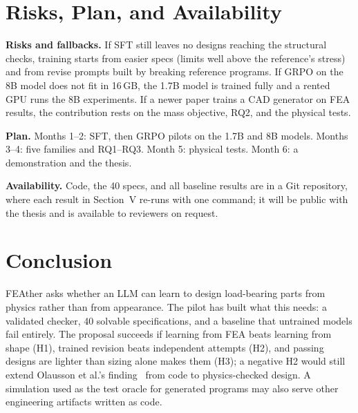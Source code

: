 \documentclass[conference]{IEEEtran}
\begin{document}
\section{Risks, Plan, and Availability}

\textbf{Risks and fallbacks.} If SFT still leaves no designs reaching the structural checks, training
starts from easier specs (limits well above the reference's stress) and from revise prompts built by
breaking reference programs. If GRPO on the 8B model does not fit in 16\,GB, the 1.7B model is trained
fully and a rented GPU runs the 8B experiments. If a newer paper trains a CAD generator on FEA
results, the contribution rests on the mass objective, RQ2, and the physical tests.

\textbf{Plan.} Months 1--2: SFT, then GRPO pilots on the 1.7B and 8B models. Months 3--4: five families
and RQ1--RQ3. Month 5: physical tests. Month 6: a demonstration and the thesis.

\textbf{Availability.} Code, the 40 specs, and all baseline results are in a Git repository, where each
result in Section~V re-runs with one command; it will be public with the thesis and is available to
reviewers on request.

\section{Conclusion}

FEAther asks whether an LLM can learn to design load-bearing parts from physics rather than from
appearance. The pilot has built what this needs: a validated checker, 40 solvable specifications, and a
baseline that untrained models fail entirely. The proposal succeeds if learning from FEA beats learning
from shape (H1), trained revision beats independent attempts (H2), and passing designs are lighter than
sizing alone makes them (H3); a negative H2 would still extend Olausson et al.'s
finding~\cite{olausson2024selfrepair} from code to physics-checked design. A simulation used as the test
oracle for generated programs may also serve other engineering artifacts written as code.



\end{document}
